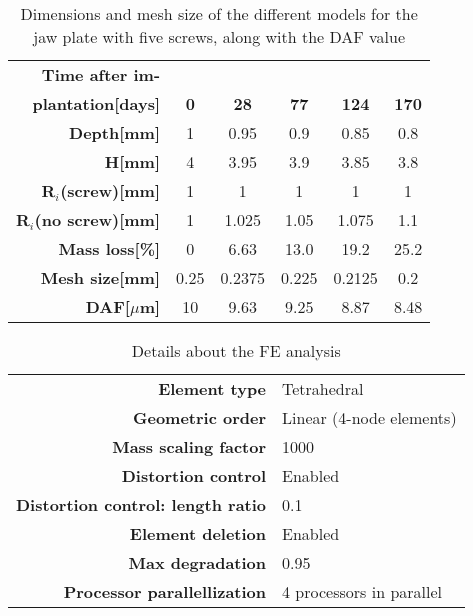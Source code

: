 \begin{table}[h]
\centering
\small
\begin{tabular}{|r|ccccc|}
\hline
\textbf{Time after im-} &  &  &  &  &  \\
\textbf{plantation{[}days{]}} & \textbf{0} & \textbf{28} & \textbf{77} & \textbf{124} & \textbf{170} \\ \hline
\textbf{Depth{[}mm{]}}                     & 1          & 0.95        & 0.9         & 0.85         & 0.8          \\
\textbf{H{[}mm{]}}                         & 4          & 3.95        & 3.9         & 3.85         & 3.8          \\
\textbf{R$_i$(screw){[}mm{]}}          & 1          & 1           & 1           & 1           & 1            \\
\textbf{R$_i$(no screw){[}mm{]}}       & 1          & 1.025           & 1.05           & 1.075           & 1.1            \\
\textbf{Mass loss{[}\%{]}}                 & 0          & 6.63        & 13.0        & 19.2         & 25.2         \\
\textbf{Mesh size{[}mm{]}}                 & 0.25       & 0.2375      & 0.225       & 0.2125       & 0.2          \\
\textbf{DAF{[$\mu$}m{]}}    & 10       & 9.63     & 9.25     & 8.87      & 8.48      \\ \hline
\end{tabular}
\caption{Dimensions and mesh size of the different models for the jaw plate with five screws, along with the DAF value}
\label{tab:BPdim}
\end{table}

\begin{table}[h]
\centering
\begin{tabular}{|r|l|}
\hline
\textbf{Element type}                     & Tetrahedral                     \\
\textbf{Geometric order}                  & Linear (4-node elements)        \\
\textbf{Mass scaling factor}              & 1000                            \\
\textbf{Distortion control}               & Enabled                         \\
\textbf{Distortion control: length ratio} & 0.1                             \\
\textbf{Element deletion}                 & Enabled                         \\
\textbf{Max degradation}                  & 0.95                            \\
\textbf{Processor parallellization}       & 4 processors in parallel        \\ \hline
\end{tabular}
\caption{Details about the FE analysis}
\label{tab:abaqus}
\end{table}

